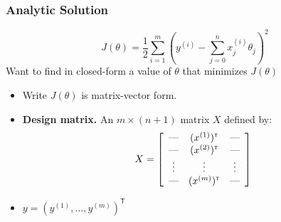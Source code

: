 \documentclass[xcolor=table]{beamer}
\newcommand{\trans}[1]{\ensuremath{#1}^{\scriptscriptstyle{\textsf{T}}}}
\begin{document}
\begin{frame}[t]
\frametitle{Analytic Solution}
\[J(\theta) = 
    \frac{1}{2} \sum_{i = 1}^{m} \left (y^{(i)} - \sum_{j = 0}^{n} x^{(i)}_j \theta_j \right )^2\]  
Want to find in closed-form a value of $\theta$ that minimizes $J(\theta)$ 

\begin{itemize}
    \item Write $J(\theta)$ is matrix-vector form.
    
    \pause

    \item \textbf{Design matrix.} An $m \times (n + 1)$ matrix $X$ defined by:
    \[
        X = \left [ \begin{array}{ccc}
                        \hbox{---} & \trans{(x^{(1)})} & \hbox{---} \\
                        \hbox{---} & \trans{(x^{(2)})} & \hbox{---} \\
                        \vdots     & \vdots                   & \vdots     \\
                        \hbox{---} & \trans{(x^{(m)})} & \hbox{---} \\
                   \end{array}
            \right ]
    \]

    \pause

    \item $y = \trans{(y^{(1)}, \ldots, y^{(m)})}$
\end{itemize}
\end{frame}
\end{document}

